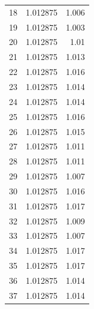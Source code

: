 \begin{table}[H]
\begin{tabular}{l c r}
		18              & 1.012875                         & 1.006                              \\
		19              & 1.012875                         & 1.003                              \\
		20              & 1.012875                         & 1.01                               \\
		21              & 1.012875                         & 1.013                              \\
		22              & 1.012875                         & 1.016                              \\
		23              & 1.012875                         & 1.014                              \\
		24              & 1.012875                         & 1.014                              \\
		25              & 1.012875                         & 1.016                              \\
		26              & 1.012875                         & 1.015                              \\
		27              & 1.012875                         & 1.011                              \\
		28              & 1.012875                         & 1.011                              \\
		29              & 1.012875                         & 1.007                              \\
		30              & 1.012875                         & 1.016                              \\
		31              & 1.012875                         & 1.017                              \\
		32              & 1.012875                         & 1.009                              \\
		33              & 1.012875                         & 1.007                              \\
		34              & 1.012875                         & 1.017                              \\
		35              & 1.012875                         & 1.017                              \\
		36              & 1.012875                         & 1.014                              \\
		37              & 1.012875                         & 1.014                              \\ \bottomrule
	\end{tabular}
\end{table}

